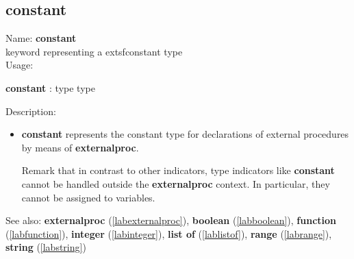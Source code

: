 \subsection{constant}
\label{labconstant}
\noindent Name: \textbf{constant}\\
keyword representing a 	extsf{constant} type \\
\noindent Usage: 
\begin{center}
\textbf{constant} : \textsf{type type}
\end{center}
\noindent Description: \begin{itemize}

\item \textbf{constant} represents the \textsf{constant} type for declarations
   of external procedures by means of \textbf{externalproc}.
    
   Remark that in contrast to other indicators, type indicators like
   \textbf{constant} cannot be handled outside the \textbf{externalproc} context.  In
   particular, they cannot be assigned to variables.
\end{itemize}
See also: \textbf{externalproc} (\ref{labexternalproc}), \textbf{boolean} (\ref{labboolean}), \textbf{function} (\ref{labfunction}), \textbf{integer} (\ref{labinteger}), \textbf{list of} (\ref{lablistof}), \textbf{range} (\ref{labrange}), \textbf{string} (\ref{labstring})
